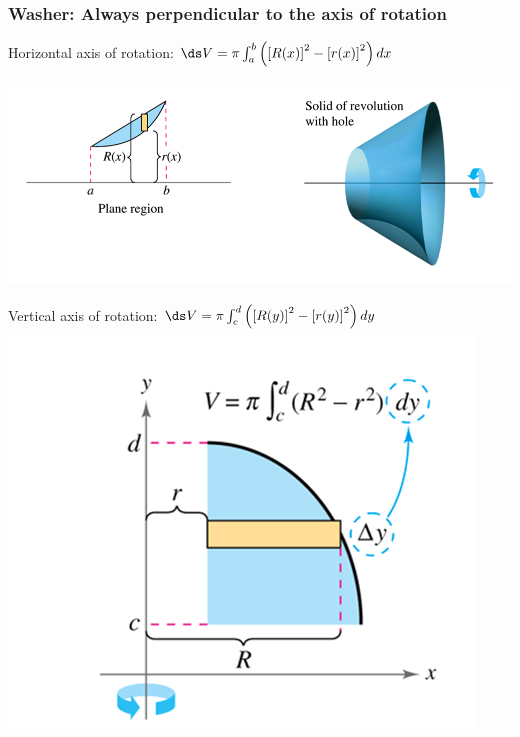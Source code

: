 \begin{frame}
\frametitle{Washer: Always perpendicular to the axis of rotation}
Horizontal axis of rotation:
$\ds 
V=\pi \int_a^b \left( \left[R(x)\right]^2-\left[r(x)\right]^2\right)dx
$

\includegraphics[height=.3\textheight]{volumes/pictures/horizontal}

\pause 
Vertical axis of rotation:
$\ds 
V=\pi \int_c^d \left( \left[R(y)\right]^2-\left[r(y)\right]^2\right)dy
$
\includegraphics[height=.3\textheight]{volumes/pictures/vertical2}


\end{frame}





